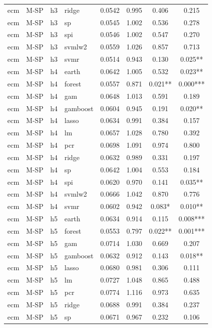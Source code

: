 \begin{ThreePartTable}
\begin{longtable}[t]{llclcccc}
ecm & M-SP & h3 & ridge & 0.0542 & 0.995 & 0.406 & 0.215\\
ecm & M-SP & h3 & sp & 0.0545 & 1.002 & 0.536 & 0.278\\
ecm & M-SP & h3 & spi & 0.0546 & 1.002 & 0.547 & 0.270\\
ecm & M-SP & h3 & svmlw2 & 0.0559 & 1.026 & 0.857 & 0.713\\
ecm & M-SP & h3 & svmr & 0.0514 & 0.943 & 0.130 & 0.025**\\
\addlinespace
ecm & M-SP & h4 & earth & 0.0642 & 1.005 & 0.532 & 0.023**\\
ecm & M-SP & h4 & forest & 0.0557 & 0.871 & 0.021** & 0.000***\\
ecm & M-SP & h4 & gam & 0.0648 & 1.013 & 0.591 & 0.189\\
ecm & M-SP & h4 & gamboost & 0.0604 & 0.945 & 0.191 & 0.020**\\
ecm & M-SP & h4 & lasso & 0.0634 & 0.991 & 0.384 & 0.157\\
ecm & M-SP & h4 & lm & 0.0657 & 1.028 & 0.780 & 0.392\\
ecm & M-SP & h4 & pcr & 0.0698 & 1.091 & 0.974 & 0.800\\
ecm & M-SP & h4 & ridge & 0.0632 & 0.989 & 0.331 & 0.197\\
ecm & M-SP & h4 & sp & 0.0642 & 1.004 & 0.553 & 0.184\\
ecm & M-SP & h4 & spi & 0.0620 & 0.970 & 0.141 & 0.035**\\
ecm & M-SP & h4 & svmlw2 & 0.0666 & 1.042 & 0.870 & 0.776\\
ecm & M-SP & h4 & svmr & 0.0602 & 0.942 & 0.083* & 0.010**\\
\addlinespace
ecm & M-SP & h5 & earth & 0.0634 & 0.914 & 0.115 & 0.008***\\
ecm & M-SP & h5 & forest & 0.0553 & 0.797 & 0.022** & 0.001***\\
ecm & M-SP & h5 & gam & 0.0714 & 1.030 & 0.669 & 0.207\\
ecm & M-SP & h5 & gamboost & 0.0632 & 0.912 & 0.143 & 0.018**\\
ecm & M-SP & h5 & lasso & 0.0680 & 0.981 & 0.306 & 0.111\\
ecm & M-SP & h5 & lm & 0.0727 & 1.048 & 0.865 & 0.488\\
ecm & M-SP & h5 & pcr & 0.0774 & 1.116 & 0.973 & 0.635\\
ecm & M-SP & h5 & ridge & 0.0688 & 0.991 & 0.384 & 0.237\\
ecm & M-SP & h5 & sp & 0.0671 & 0.967 & 0.232 & 0.106\\

\end{longtable}
\end{ThreePartTable}

